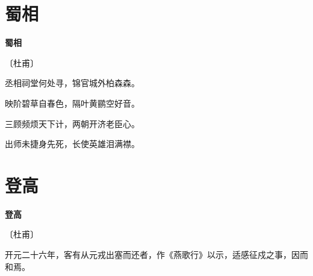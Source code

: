 \documentclass[12pt,UTF-8,openany,fontset=none]{ctexbook}
\begin{document}
\section{蜀相}


\begin{center}
    {\bfseries 蜀相}

    \vspace{18pt}

    \begin{large}\xuwen
        〔杜甫〕
    \end{large}

\end{center}

    \vspace{18pt}  %

\begin{center}
    \begin{Large}

        丞相祠堂何处寻，锦官城外柏森森。

        映阶碧草自春色，隔叶黄鹂空好音。

        三顾频烦天下计，两朝开济老臣心。

        出师未捷身先死，长使英雄泪满襟。

    \end{Large}

\end{center}

\vspace{8pt}
\clearpage

\section{登高}


\begin{center}
    {\bfseries 登高}

    \vspace{18pt}

    \begin{large}\xuwen
        〔杜甫〕
    \end{large}

\end{center}

    \vspace{12pt}\mbox{}

    \begin{large}\xuwen
        开元二十六年，客有从元戎出塞而还者，作《燕歌行》以示，适感征戍之事，因而和焉。
    \end{large}
\end{document}
